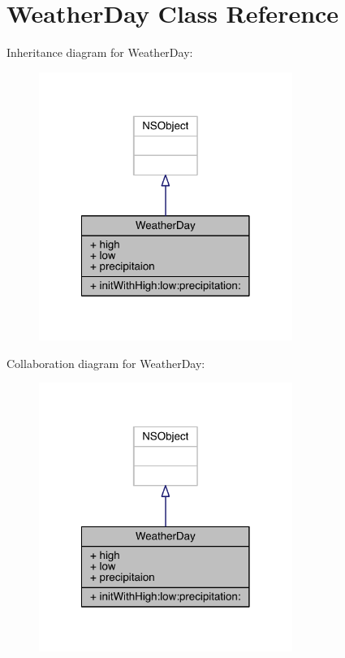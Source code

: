 \hypertarget{interface_weather_day}{\section{Weather\-Day Class Reference}
\label{interface_weather_day}
}


Inheritance diagram for Weather\-Day\-:\nopagebreak
\begin{figure}[H]
\begin{center}
\leavevmode
\includegraphics[width=234pt]{interface_weather_day__inherit__graph}
\end{center}
\end{figure}


Collaboration diagram for Weather\-Day\-:\nopagebreak
\begin{figure}[H]
\begin{center}
\leavevmode
\includegraphics[width=234pt]{interface_weather_day__coll__graph}
\end{center}
\end{figure}
